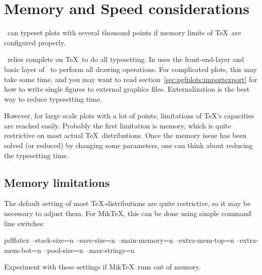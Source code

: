 \section{Memory and Speed considerations}
\label{sec:pgfplots:optimization}
\PGFPlots\ can typeset plots with several thousand points if memory limits of \TeX\ are configured properly.
\begin{codeexample}[]
\end{codeexample}

\PGFPlots\ relies complete on \TeX\ to do all typesetting. In uses the front-end-layer and basic layer of \PGF\ to perform all drawing operations. For complicated plots, this may take some time, and you may want to read section~\ref{sec:pgfplots:importexport} for how to write single figures to external graphics files. Externalization is the best way to reduce typesetting time.

However, for large scale plots with a lot of points, limitations of \TeX's capacities are reached easily. Probably the first limitation is memory, which is quite restrictive on most actual \TeX\ distributions. Once the memory issue has been solved (or reduced) by changing some parameters, one can think about reducing the typesetting time.

\subsection{Memory limitations}
The default setting of most \TeX-distributions are quite restrictive, so it may be necessary to adjust them. For Mik\TeX, this can be done using simple command line switches:
\begin{codeexample}
pdflatex 
	--stack-size=n --save-size=n 
	--main-memory=n --extra-mem-top=n --extra-mem-bot=n
	--pool-size=n --max-strings=n 
\end{codeexample}
\noindent Experiment with these settings if Mik\TeX\ runs out of memory. 

